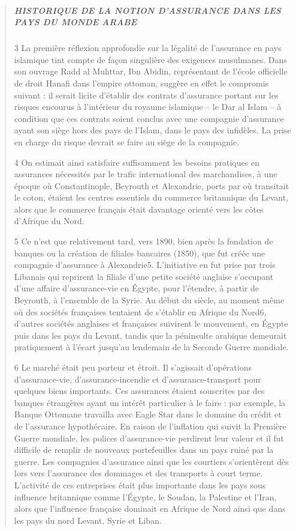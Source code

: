 \begin{quote}
\subparagraph{HISTORIQUE DE LA NOTION D’ASSURANCE DANS LES PAYS DU MONDE ARABE}

3 La première réflexion approfondie sur la légalité de l’assurance en pays islamique tint compte de façon singulière des exigences musulmanes. Dans son ouvrage Radd al Muhttar, Ibn Abidin, représentant de l’école officielle de droit Hanafi dans l’empire ottoman, suggère en effet le compromis suivant : il serait licite d’établir des contrats d’assurance portant sur les risques encourus à l’intérieur du royaume islamique – le Dar al Islam – à condition que ces contrats soient conclus avec une compagnie d’assurance ayant son siège hors des pays de l’Islam, dans le pays des infidèles. La prise en charge du risque devrait se faire au siège de la compagnie.

4 On estimait ainsi satisfaire suffisamment les besoins pratiques en assurances nécessités par le trafic international des marchandises, à une époque où Constantinople, Beyrouth et Alexandrie, ports par où transitait le coton, étaient les centres essentiels du commerce britannique du Levant, alors que le commerce français était davantage orienté vers les côtes d’Afrique du Nord.
 
5 Ce n’est que relativement tard, vers 1890, bien après la fondation de banques ou la création de filiales bancaires (1850), que fut créée une compagnie d’assurance à Alexandrie5. L’initiative en fut prise par trois Libanais qui reprirent la filiale d’une petite société anglaise s’occupant d’une affaire d’assurance-vie en Égypte, pour l’étendre, à partir de Beyrouth, à l’ensemble de la Syrie. Au début du siècle, au moment même où des sociétés françaises tentaient de s’établir en Afrique du Nord6, d’autres sociétés anglaises et françaises suivirent le mouvement, en Égypte puis dans les pays du Levant, tandis que la péninsulte arabique demeurait pratiquement à l’écart jusqu’au lendemain de la Seconde Guerre mondiale.

6 Le marché était peu porteur et étroit. Il s’agissait d’opérations d’assurance-vie, d’assurance-incendie et d’assurance-transport pour quelques biens importants. Ces assurances étaient souscrites par des banques étrangères ayant un intérêt particulier à le faire : par exemple, la Banque Ottomane travailla avec Eagle Star dans le domaine du crédit et de l’assurance hypothécaire. En raison de l’inflation qui suivit la Première Guerre mondiale, les polices d’assurance-vie perdirent leur valeur et il fut difficile de remplir de nouveaux portefeuilles dans un pays ruiné par la guerre. Les compagnies d’assurance ainsi que les courtiers s’orientèrent dès lors vers l’assurance des dommages et des transports à court terme. L’activité de ces entreprises était plus importante dans les pays sous influence britannique comme l’Égypte, le Soudan, la Palestine et l’Iran, alors que l’influence française dominait en Afrique de Nord ainsi que dans les pays du nord Levant, Syrie et Liban.



\end{quote}
